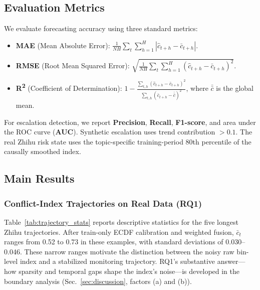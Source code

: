 \documentclass[journal]{IEEEtran}
\begin{document}
\subsection{Evaluation Metrics}

We evaluate forecasting accuracy using three standard metrics:
\begin{itemize}
\item \textbf{MAE} (Mean Absolute Error): $\frac{1}{N H}\sum_{t}\sum_{h=1}^{H}|\hat{c}_{t+h}-\bar{c}_{t+h}|$.
\item \textbf{RMSE} (Root Mean Squared Error): $\sqrt{\frac{1}{N H}\sum_{t}\sum_{h=1}^{H}(\hat{c}_{t+h}-\bar{c}_{t+h})^2}$.
\item \textbf{R\textsuperscript{2}} (Coefficient of Determination): $1 - \frac{\sum_{t,h}(\hat{c}_{t+h}-\bar{c}_{t+h})^2}{\sum_{t,h}(\bar{c}_{t+h}-\bar{\bar{c}})^2}$, where $\bar{\bar{c}}$ is the global mean.
\end{itemize}

For escalation detection, we report \textbf{Precision}, \textbf{Recall}, \textbf{F1-score}, and area under the ROC curve (\textbf{AUC}). Synthetic escalation uses trend contribution $>0.1$. The real Zhihu risk state uses the topic-specific training-period 80th percentile of the causally smoothed index.

\subsection{Main Results}
\label{sec:main_results}

\subsubsection{Conflict-Index Trajectories on Real Data (RQ1)}

Table~\ref{tab:trajectory_stats} reports descriptive statistics for the five longest Zhihu trajectories. After train-only ECDF calibration and weighted fusion, $\bar{c}_t$ ranges from 0.52 to 0.73 in these examples, with standard deviations of 0.030--0.046. These narrow ranges motivate the distinction between the noisy raw bin-level index and a stabilized monitoring trajectory. RQ1's substantive answer---how sparsity and temporal gaps shape the index's noise---is developed in the boundary analysis (Sec.~\ref{sec:discussion}, factors (a) and (b)).
\end{document}
